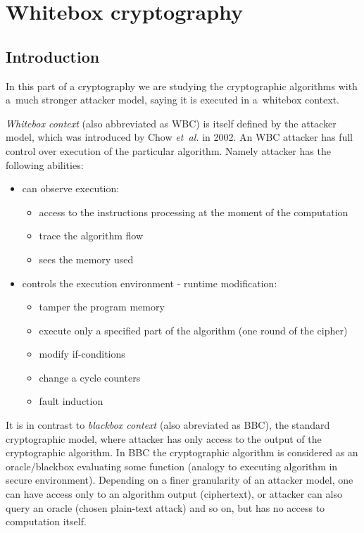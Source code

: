 \documentclass[11pt,oneside,final]{fithesis2}
\begin{document}
\chapter{Whitebox cryptography}
    
    \section{Introduction}    
    In this part of a cryptography we are studying the cryptographic algorithms with a~much stronger attacker model, saying it is executed in a~whitebox context. 

    \emph{Whitebox context} (also abbreviated as WBC) is itself defined by the attacker model, which was introduced by Chow \emph{et~al.} \citep{Chow02white-boxcryptography} in 2002.
    An WBC attacker has full control over execution of the particular algorithm. Namely attacker has the following abilities:
    
    \begin{itemize}
	\item can observe execution:
	\begin{itemize}
	    \item access to the instructions processing at the moment of the computation
	    \item trace the algorithm flow
	    \item sees the memory used
	\end{itemize}
	\item controls the execution environment - runtime modification:
	\begin{itemize}
	    \item tamper the program memory
	    \item execute only a specified part of the algorithm (one round of the cipher)
	    \item modify if-conditions
	    \item change a cycle counters
	    \item fault induction
	\end{itemize}
    \end{itemize}
    
    It is in contrast to \emph{blackbox context} (also abreviated as BBC), the standard cryptographic model, where attacker has only access to the output of the cryptographic algorithm. 
    In BBC the cryptographic algorithm is considered as an oracle/blackbox evaluating some function (analogy to executing algorithm in secure environment).
    Depending on a finer granularity of an attacker model, one can have 
    access only to an algorithm output (ciphertext), or attacker can also query an oracle (chosen plain-text attack) and so on, but has no access to computation itself.
\end{document}

